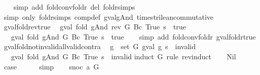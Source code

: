 \begin{isabellebody}
%
\isadelimproof
\ \ %
\endisadelimproof
%
\isatagproof
{}\isamarkupfalse%
\ {\isacharparenleft}simp\ add{\isacharcolon}\ fold{\isacharunderscore}conv{\isacharunderscore}foldr\ del{\isacharcolon}\ foldr{\isachardot}simps{\isacharparenright}\isanewline
\ \ \isamarkupfalse%
\ {\isacharparenleft}simp\ only{\isacharcolon}\ foldr{\isachardot}simps\ comp{\isacharunderscore}def\ gval{\isacharunderscore}gAnd\ times{\isacharunderscore}trilean{\isacharunderscore}commutative{\isacharparenright}%
\endisatagproof
{\isafoldproof}%
%
\isadelimproof
\isanewline
%
\endisadelimproof
\isanewline
{}\isamarkupfalse%
\ gval{\isacharunderscore}fold{\isacharunderscore}rev{\isacharunderscore}true{\isacharcolon}\isanewline
\ \ {\isachardoublequoteopen}gval\ {\isacharparenleft}fold\ gAnd\ {\isacharparenleft}rev\ G{\isacharparenright}\ {\isacharparenleft}Bc\ True{\isacharparenright}{\isacharparenright}\ s\ {\isacharequal}\ true\ {\isasymLongrightarrow}\isanewline
\ \ \ gval\ {\isacharparenleft}fold\ gAnd\ G\ {\isacharparenleft}Bc\ True{\isacharparenright}{\isacharparenright}\ s\ {\isacharequal}\ true{\isachardoublequoteclose}\isanewline
%
\isadelimproof
\ \ %
\endisadelimproof
%
\isatagproof
{}\isamarkupfalse%
\ {\isacharparenleft}simp\ add{\isacharcolon}\ fold{\isacharunderscore}conv{\isacharunderscore}foldr\ gval{\isacharunderscore}foldr{\isacharunderscore}true{\isacharparenright}%
\endisatagproof
{\isafoldproof}%
%
\isadelimproof
\isanewline
%
\endisadelimproof
\isanewline
{}\isamarkupfalse%
\ gval{\isacharunderscore}fold{\isacharunderscore}not{\isacharunderscore}invalid{\isacharunderscore}all{\isacharunderscore}valid{\isacharunderscore}contra{\isacharcolon}\isanewline
\ \ {\isachardoublequoteopen}{\isasymexists}g\ {\isasymin}\ set\ G{\isachardot}\ gval\ g\ s\ {\isacharequal}\ invalid\ {\isasymLongrightarrow}\isanewline
\ \ \ gval\ {\isacharparenleft}fold\ gAnd\ G\ {\isacharparenleft}Bc\ True{\isacharparenright}{\isacharparenright}\ s\ {\isacharequal}\ invalid{\isachardoublequoteclose}\isanewline
%
\isadelimproof
%
\endisadelimproof
%
\isatagproof
{}\isamarkupfalse%
{\isacharparenleft}induct\ G\ rule{\isacharcolon}\ rev{\isacharunderscore}induct{\isacharparenright}\isanewline
\ \ \isamarkupfalse%
\ Nil\isanewline
\ \ \isamarkupfalse%
\ \isamarkupfalse%
\ {\isacharquery}case\isanewline
\ \ \ \ \isamarkupfalse%
\ simp\isanewline
{}\isamarkupfalse%
\isanewline
\ \ \isamarkupfalse%
\ {\isacharparenleft}snoc\ a\ G{\isacharparenright}\isanewline

\end{isabellebody}
